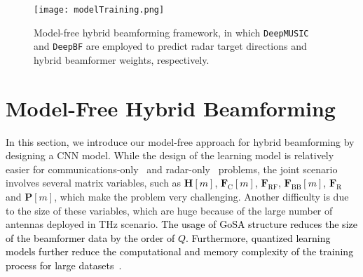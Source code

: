 \documentclass[journal,10pt]{IEEEtran}
\begin{document}
	\begin{figure}[t]
		\centering
		{\texttt{[image: modelTraining.png]} } 
		\caption{Model-free hybrid beamforming framework, in which \texttt{DeepMUSIC}~\cite{elbir_DL_MUSIC} and \texttt{DeepBF} are employed to predict radar target directions and hybrid beamformer weights, respectively.
		}
		\label{fig_Model}
	\end{figure}
	
	
	
	\section{Model-Free Hybrid Beamforming}
	\label{sec:modelFree}
	In this section, we introduce our model-free approach for hybrid beamforming by designing a CNN model. While the design of the learning model is relatively easier for  communications-only~\cite{elbirQuantizedCNN2019,elbir2019online} and radar-only~\cite{elbir_DL_MUSIC} problems, the joint scenario involves several matrix variables, such as \textcolor{black}{$\mathbf{H}[m]$, $\mathbf{F}_\mathrm{C}[m]$, $\mathbf{F}_\mathrm{RF}$, $\mathbf{F}_\mathrm{BB}[m]$, $\mathbf{F}_\mathrm{R}$ }and $\mathbf{P}[m]$, which make the problem very challenging. Another difficulty is due to the size of these variables, which are huge because of the large number of antennas deployed in THz scenario. \textcolor{black}{The usage of GoSA structure reduces the size of the beamformer data by the order of $Q$. Furthermore, quantized learning models further reduce the computational and memory complexity of the training process for large datasets~\cite{elbirQuantizedCNN2019}.}
	
\end{document}
